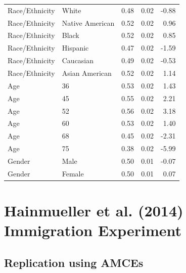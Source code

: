 \documentclass[a4paper,12pt]{article}\usepackage[]{graphicx}\usepackage[]{color}
\begin{document}
\begin{table}[ht]
\begin{tabular}{lp{3in}rrr}
  Race/Ethnicity & White & 0.48 & 0.02 & -0.88 \\ 
  Race/Ethnicity & Native American & 0.52 & 0.02 & 0.96 \\ 
  Race/Ethnicity & Black & 0.52 & 0.02 & 0.85 \\ 
  Race/Ethnicity & Hispanic & 0.47 & 0.02 & -1.59 \\ 
  Race/Ethnicity & Caucasian & 0.49 & 0.02 & -0.53 \\ 
  Race/Ethnicity & Asian American & 0.52 & 0.02 & 1.14 \\ 
  Age & 36 & 0.53 & 0.02 & 1.43 \\ 
  Age & 45 & 0.55 & 0.02 & 2.21 \\ 
  Age & 52 & 0.56 & 0.02 & 3.18 \\ 
  Age & 60 & 0.53 & 0.02 & 1.40 \\ 
  Age & 68 & 0.45 & 0.02 & -2.31 \\ 
  Age & 75 & 0.38 & 0.02 & -5.99 \\ 
  Gender & Male & 0.50 & 0.01 & -0.07 \\ 
  Gender & Female & 0.50 & 0.01 & 0.07 \\ 
   \hline
\end{tabular}
\endgroup
\end{table}


\clearpage

\section{Hainmueller et al. (2014) Immigration Experiment}\label{app:hainmuellerimmigration}

\subsection{Replication using AMCEs}
\end{document}
